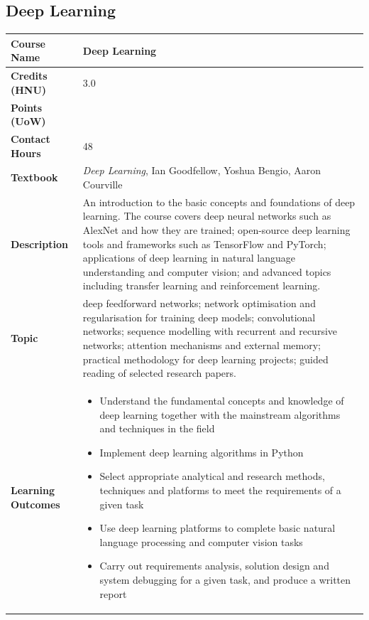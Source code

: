 \documentclass{article}
\begin{document}
\subsection{Deep Learning}
\renewcommand{\arraystretch}{1.5} %
\begin{longtable}{|p{3cm}|p{10cm}|}
\hline
\textbf{Course Name} & Deep Learning \\
\hline
\textbf{Credits (HNU)} & 3.0 \\
\hline
\textbf{Points (UoW)} & \\
\hline
\textbf{Contact Hours} & 48 \\
\hline
\textbf{Textbook} & \emph{Deep Learning}, Ian Goodfellow, Yoshua Bengio, Aaron Courville \\
\hline
\textbf{Description} & An introduction to the basic concepts and foundations of deep learning. The course covers deep neural networks such as AlexNet
  and how they are trained; open-source deep learning tools and frameworks such as TensorFlow and PyTorch; applications of deep
  learning in natural language understanding and computer vision; and advanced topics including transfer learning and reinforcement
  learning.\\
\hline
\textbf{Topic} & deep feedforward networks; network optimisation and regularisation for training deep models; convolutional networks; sequence modelling with recurrent and recursive networks; attention mechanisms and external memory; practical methodology for deep learning projects; guided reading of selected research papers. \\
\hline
\textbf{Learning Outcomes} & 
    \begin{itemize}
        \item Understand the fundamental concepts and knowledge of deep learning together with the mainstream algorithms and techniques in the field
        \item Implement deep learning algorithms in Python
        \item Select appropriate analytical and research methods, techniques and platforms to meet the requirements of a given task
        \item Use deep learning platforms to complete basic natural language processing and computer vision tasks
        \item Carry out requirements analysis, solution design and system debugging for a given task, and produce a written report
    \end{itemize} \\
\hline
\end{longtable}
\end{document}
